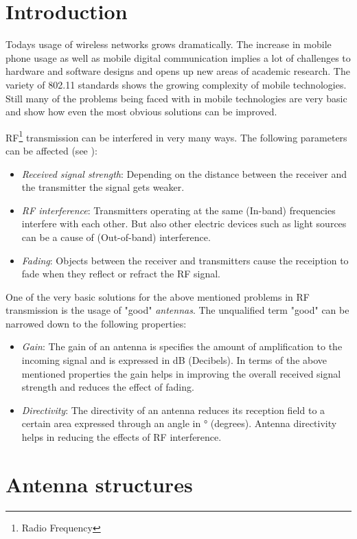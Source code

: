 \section{Introduction}
Todays usage of wireless networks grows dramatically. The increase in mobile phone usage as well as mobile digital communication implies a lot of challenges to hardware and software designs and opens up new areas of academic research. The variety of 802.11 standards shows the growing complexity of mobile technologies. Still many of the problems being faced with in mobile technologies are very basic and show how even the most obvious solutions can be improved.

RF\footnote{Radio Frequency} transmission can be interfered in very many ways. The following parameters can be affected (see \cite{kassner}):

\begin{itemize}
\item \emph{Received signal strength}: Depending on the distance between the receiver and the transmitter the signal gets weaker.
\item \emph{RF interference}: Transmitters operating at the same (In-band) frequencies interfere with each other. But also other electric devices such as light sources can be a cause of (Out-of-band) interference.
\item \emph{Fading}: Objects between the receiver and transmitters cause the receiption to fade when they reflect or refract the RF signal.
\end{itemize}

One of the very basic solutions for the above mentioned problems in RF transmission is the usage of "good" \emph{antennas}. The unqualified term "good" can be narrowed down to the following properties:

\begin{itemize}
\item \emph{Gain}: The gain of an antenna is specifies the amount of amplification to the incoming signal and is expressed in dB (Decibels). In terms of the above mentioned properties the gain helps in improving the overall received signal strength and reduces the effect of fading.
\item \emph{Directivity}: The directivity of an antenna reduces its reception field to a certain area expressed through an angle in ° (degrees). Antenna directivity helps in reducing the effects of RF interference.
\end{itemize}

\section{Antenna structures}
